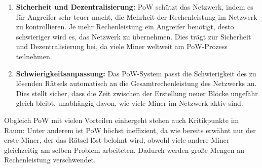 \begin{itemize}
\begin{enumerate}[label=\arabic*.]
		\item \textbf{Sicherheit und Dezentralisierung:} PoW schützt das Netzwerk, indem es für Angreifer sehr teuer macht, die Mehrheit der Rechenleistung im Netzwerk zu kontrollieren. Je mehr Rechenleistung ein Angreifer benötigt, desto schwieriger wird es, das Netzwerk zu übernehmen. Dies trägt zur Sicherheit und Dezentralisierung bei, da viele Miner weltweit am PoW-Prozess teilnehmen.
		
		\item \textbf{Schwierigkeitsanpassung:} Das PoW-System passt die Schwierigkeit des zu lösenden Rätsels automatisch an die Gesamtrechenleistung des Netzwerks an. Dies stellt sicher, dass die Zeit zwischen der Erstellung neuer Blöcke ungefähr gleich bleibt, unabhängig davon, wie viele Miner im Netzwerk aktiv sind.
	\end{enumerate}
	
	Obgleich PoW mit vielen Vorteilen einhergeht stehen auch Kritikpunkte im Raum: Unter anderem ist PoW höchst ineffizient, da wie bereits erwähnt nur der erste Miner, der das Rätsel löst belohnt wird, obwohl viele andere Miner gleichzeitig am selben Problem arbeiteten. Dadurch werden große Mengen an Rechenleistung verschwendet. 
	
	
\end{itemize}